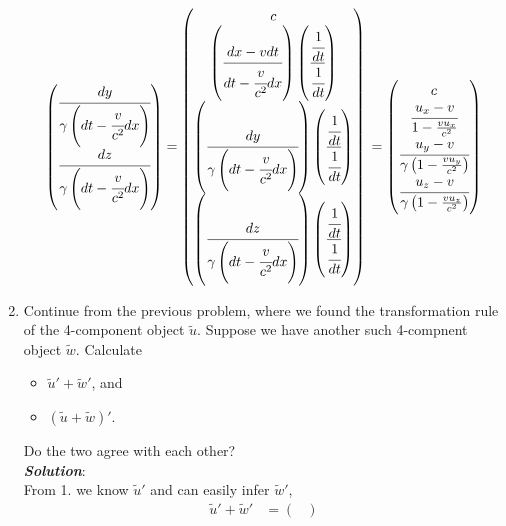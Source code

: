 \documentclass[10pt,a4paper]{article}
\theoremstyle{break}
\begin{document}
\begin{enumerate}
\[\begin{pmatrix}
      \cfrac{dy}{\gamma \left(dt - \cfrac{v}{c^2}dx\right)}\\
      \cfrac{dz}{\gamma \left(dt - \cfrac{v}{c^2}dx\right)}
    \end{pmatrix}
    = \begin{pmatrix}
      c\\
      \left(\cfrac{dx - vdt}{dt - \cfrac{v}{c^2}dx}\right)\left(\cfrac{\cfrac{1}{dt}}{\cfrac{1}{dt}}\right)\\
      \left(\cfrac{dy}{\gamma \left(dt - \cfrac{v}{c^2}dx\right)}\right)\left(\cfrac{\cfrac{1}{dt}}{\cfrac{1}{dt}}\right)\\
      \left(\cfrac{dz}{\gamma \left(dt - \cfrac{v}{c^2}dx\right)}\right)\left(\cfrac{\cfrac{1}{dt}}{\cfrac{1}{dt}}\right)
    \end{pmatrix}\\
    = \begin{pmatrix}
      c \\
      \cfrac{u_x - v}{1 - \frac{vu_x}{c^2}}\\
      \cfrac{u_y - v}{\gamma\left(1 - \frac{vu_y}{c^2}\right)}\\
      \cfrac{u_z - v}{\gamma\left(1 - \frac{vu_z}{c^2}\right)}
    \end{pmatrix}
    \]
    \item Continue from the previous problem, where we found the transformation rule of the 4-component object $\tilde{u}$. Suppose we have another such 4-compnent object $\tilde{w}$. Calculate
      \begin{itemize}
        \item $\widetilde{u}' + \widetilde{w}'$, and
        \item $(\widetilde{u} + \widetilde{w})'$.
      \end{itemize}
    Do the two agree with each other?
    \newline\\
    \textbf{\textit{Solution}}:
    \newline\\
    From 1. we know $\widetilde{u}'$ and can easily infer $\widetilde{w}'$,
    \begin{equation*}
      \begin{split}
        \widetilde{u}' + \widetilde{w}' &= \begin{pmatrix}

\end{pmatrix}
\end{split}
\end{equation*}
\end{enumerate}
\end{document}
